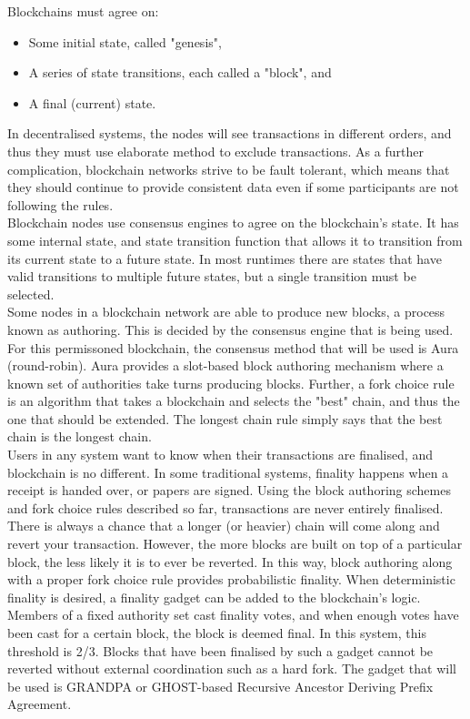 Blockchains must agree on:

\begin{itemize}
	\item Some initial state, called "genesis", 
	\item A series of state transitions, each called a "block", and
	\item A final (current) state.
\end{itemize}

In decentralised systems, the nodes will see transactions in different orders, and thus they must use elaborate method to exclude transactions. As a further complication, blockchain networks strive to be fault tolerant, which means that they should continue to provide consistent data even if some participants are not following the rules. \\

Blockchain nodes use consensus engines to agree on the blockchain's state. It has some internal state, and state transition function that allows it to transition from its current state to a future state. In most runtimes there are states that have valid transitions to multiple future states, but a single transition must be selected. \\

Some nodes in a blockchain network are able to produce new blocks, a process known as authoring. This is decided by the consensus engine that is being used. For this permissoned blockchain, the consensus method that will be used is Aura (round-robin). Aura provides a slot-based block authoring mechanism where a known set of authorities take turns producing blocks. Further, a fork choice rule is an algorithm that takes a blockchain and selects the "best" chain, and thus the one that should be extended. The longest chain rule simply says that the best chain is the longest chain. \\

Users in any system want to know when their transactions are finalised, and blockchain is no different. In some traditional systems, finality happens when a receipt is handed over, or papers are signed. Using the block authoring schemes and fork choice rules described so far, transactions are never entirely finalised. There is always a chance that a longer (or heavier) chain will come along and revert your transaction. However, the more blocks are built on top of a particular block, the less likely it is to ever be reverted. In this way, block authoring along with a proper fork choice rule provides probabilistic finality. When deterministic finality is desired, a finality gadget can be added to the blockchain's logic. Members of a fixed authority set cast finality votes, and when enough votes have been cast for a certain block, the block is deemed final. In this system, this threshold is 2/3. Blocks that have been finalised by such a gadget cannot be reverted without external coordination such as a hard fork. The gadget that will be used is GRANDPA or GHOST-based Recursive Ancestor Deriving Prefix Agreement. \\

